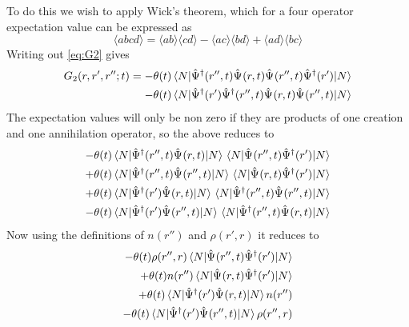 \begin{solution}
To do this we wish to apply Wick's theorem, which for a four operator expectation value can be expressed as
\begin{equation}
    \langle abcd  \rangle = \langle ab \rangle \langle cd \rangle - \langle ac \rangle \langle bd \rangle + \langle ad \rangle \langle bc \rangle
\end{equation}
Writing out \eqref{eq:G2} gives
\begin{equation}
    \begin{split}
        G_2(r,r',r'';t) = -\theta(t) \mel{N}{ \hat{\Psi}_{}^{\dagger}(r'',t)  \hat{\Psi}_{}(r,t) \hat{\Psi}_{}(r'',t)\hat{\Psi}_{}^{\dagger}(r')}{N} \\
         -\theta(t) \mel{N}{\hat{\Psi}_{}^{\dagger}(r') \hat{\Psi}_{}^{\dagger}(r'',t)  \hat{\Psi}_{}(r,t) \hat{\Psi}_{}(r'',t)}{N}
    \end{split}
\end{equation}
The expectation values will only be non zero if they are products of one creation and one annihilation operator, so the above reduces to
\begin{equation}
\begin{split}
    -\theta(t) \mel{N}{ \hat{\Psi}_{}^{\dagger}(r'',t)  \hat{\Psi}_{}(r,t)}{N} \mel{N}{\hat{\Psi}_{}(r'',t)\hat{\Psi}_{}^{\dagger}(r') }{N} \\
    +\theta(t) \mel{N}{ \hat{\Psi}_{}^{\dagger}(r'',t)   \hat{\Psi}_{}(r'',t) }{N} \mel{N}{\hat{\Psi}_{}(r,t)\hat{\Psi}_{}^{\dagger}(r') }{N}\\
    +\theta(t) \mel{N}{\hat{\Psi}_{}^{\dagger}(r') \hat{\Psi}_{}(r,t)}{N}  \mel{N}{\hat{\Psi}_{}^{\dagger}(r'',t)   \hat{\Psi}_{}(r'',t)}{N} \\ -
    \theta(t) \mel{N}{\hat{\Psi}_{}^{\dagger}(r')   \hat{\Psi}_{}(r'',t)   }{N}  \mel{N}{\hat{\Psi}_{}^{\dagger}(r'',t)  \hat{\Psi}_{}(r,t)}{N}
    \end{split}
\end{equation}
Now using the definitions of $n(r'')$ and $\rho(r',r)$ it reduces to
\begin{equation}
\begin{split}
    -\theta(t) \rho(r'',r) \mel{N}{\anni{\Psi}{}(r'',t)\crea{\Psi}{}(r') }{N} \\
    +\theta(t) n(r'') \mel{N}{\anni{\Psi}{}(r,t)\crea{\Psi}{}(r') }{N}\\
    +\theta(t) \mel{N}{\crea{\Psi}{}(r') \anni{\Psi}{}(r,t)}{N}  n(r'') \\ -
    \theta(t) \mel{N}{\crea{\Psi}{}(r')   \anni{\Psi}{}(r'',t)   }{N}  \rho(r'',r)
    \end{split}

\end{equation}
\end{solution}
